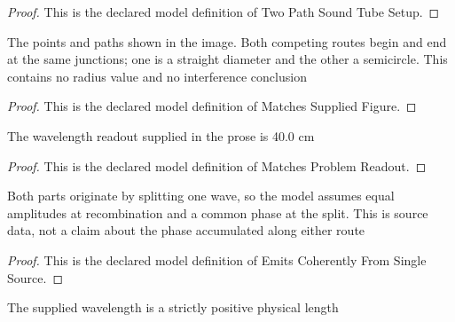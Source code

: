 \begin{proof}
  This is the declared model definition of Two Path Sound Tube Setup.
\end{proof}
\begin{definition}
  \label{def:physics:phyx-mini-0315:phyxminiproblems-problemphyxmini0315-matchessuppliedfigure}
  The points and paths shown in the image. Both competing routes begin and end at the same junctions; one is a straight diameter and the other a semicircle. This contains no radius value and no interference conclusion
\end{definition}
\begin{proof}
  This is the declared model definition of Matches Supplied Figure.
\end{proof}
\begin{definition}
  \label{def:physics:phyx-mini-0315:phyxminiproblems-problemphyxmini0315-matchesproblemreadout}
  The wavelength readout supplied in the prose is 40.0 cm
\end{definition}
\begin{proof}
  This is the declared model definition of Matches Problem Readout.
\end{proof}
\begin{definition}
  \label{def:physics:phyx-mini-0315:phyxminiproblems-problemphyxmini0315-emitscoherentlyfromsinglesource}
  Both parts originate by splitting one wave, so the model assumes equal amplitudes at recombination and a common phase at the split. This is source data, not a claim about the phase accumulated along either route
\end{definition}
\begin{proof}
  This is the declared model definition of Emits Coherently From Single Source.
\end{proof}
\begin{definition}
  \label{def:physics:phyx-mini-0315:phyxminiproblems-problemphyxmini0315-hasphysicalacousticparameters}
  The supplied wavelength is a strictly positive physical length
\end{definition}
